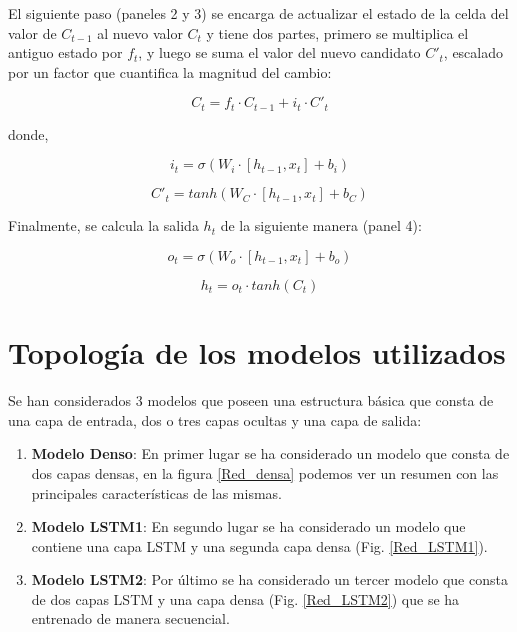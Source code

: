  El siguiente paso  (paneles 2 y 3)  se encarga de actualizar el estado de la celda del valor 
 de $C_{t-1}$ al nuevo valor $C_{t}$ y tiene dos partes, primero se multiplica el antiguo estado por $f_t$, y luego
 se suma el valor del nuevo candidato $C'_t$, escalado por un factor que cuantifica la magnitud del cambio:
 
 \begin{equation}
  C_t = f_t\cdot C_{t-1}+i_t\cdot C'_t
\end{equation}

donde,

 \begin{equation}
  i_t = \sigma(W_i\cdot[h_{t-1},x_t]+b_i)
\end{equation}

\begin{equation}
  C'_t = tanh(W_C\cdot[h_{t-1},x_t]+b_C)
\end{equation}



Finalmente, se calcula la salida $h_t$ de la siguiente manera (panel 4):

\begin{equation}
  o_t = \sigma(W_o\cdot[h_{t-1},x_t]+b_o)
\end{equation}

\begin{equation}
  h_t = o_{t}\cdot tanh(C_t)
\end{equation}

\section{Topología de los modelos utilizados}
Se han considerados 3 modelos que poseen una estructura básica que consta de una capa de entrada, dos o tres capas ocultas
y una capa de salida:


\begin{enumerate}
    \item \textbf{Modelo Denso}: En primer lugar se ha considerado un modelo que consta de dos capas densas, 
    en la figura \ref{Red_densa} podemos  ver  un resumen con las principales características de las mismas.
    \item \textbf{Modelo LSTM1}: En segundo lugar se ha considerado un modelo que contiene una capa LSTM y 
    una segunda capa densa (Fig. \ref{Red_LSTM1}).
    \item \textbf{Modelo LSTM2}: Por último se ha considerado un tercer modelo que consta de dos capas LSTM y una capa densa (Fig. \ref{Red_LSTM2}) que se 
    ha entrenado de manera secuencial.
    
\end{enumerate}


